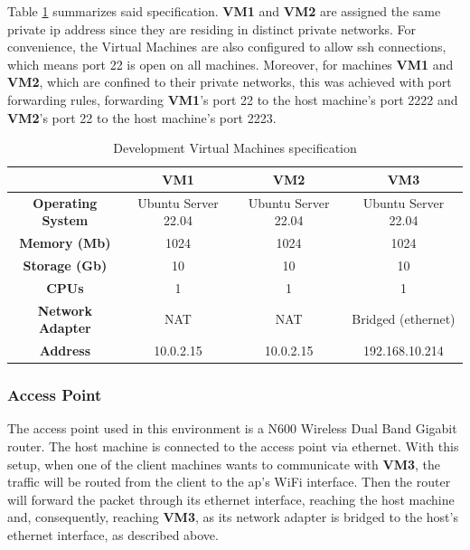 \documentclass[11pt,twoside,a4paper]{report}
\begin{document}
Table \ref{table:vmspecs} summarizes said specification. \textbf{VM1} and \textbf{VM2} are assigned the same private \ac{ip} address since they are residing in distinct private networks. For convenience, the Virtual Machines are also configured to allow \ac{ssh} connections, which means port 22 is open on all machines. Moreover, for machines \textbf{VM1} and \textbf{VM2}, which are confined to their private networks, this was achieved with port forwarding rules, forwarding \textbf{VM1}'s port 22 to the host machine's port 2222 and \textbf{VM2}'s port 22 to the host machine's port 2223.

\begin{table}[]
\centering
\begin{tabular}{c|c|c|c|}
\cline{2-4}
\multicolumn{1}{l|}{}                           & \textbf{VM1}        & \textbf{VM2}        & \textbf{VM3}        \\ \hline
\multicolumn{1}{|c|}{\textbf{Operating System}} & Ubuntu Server 22.04 & Ubuntu Server 22.04 & Ubuntu Server 22.04 \\ \hline
\multicolumn{1}{|c|}{\textbf{Memory (Mb)}}      & 1024                & 1024                & 1024                \\ \hline
\multicolumn{1}{|c|}{\textbf{Storage (Gb)}}     & 10                  & 10                  & 10                  \\ \hline
\multicolumn{1}{|c|}{\textbf{CPUs}}             & 1                   & 1                   & 1                   \\ \hline
\multicolumn{1}{|c|}{\textbf{Network Adapter}}  & NAT                 & NAT                 & Bridged (ethernet)  \\ \hline
\multicolumn{1}{|c|}{\textbf{Address}}          & 10.0.2.15           & 10.0.2.15           & 192.168.10.214      \\ \hline
\end{tabular}
\caption{Development Virtual Machines specification}
\label{table:vmspecs}
\end{table}

\subsubsection{Access Point}

The access point used in this environment is a N600 Wireless Dual Band Gigabit router. The host machine is connected to the access point via ethernet. With this setup, when one of the client machines wants to communicate with \textbf{VM3}, the traffic will be routed from the client to the \ac{ap}'s WiFi interface. Then the router will forward the packet through its ethernet interface, reaching the host machine and, consequently, reaching \textbf{VM3}, as its network adapter is bridged to the host's ethernet interface, as described above.
\end{document}
